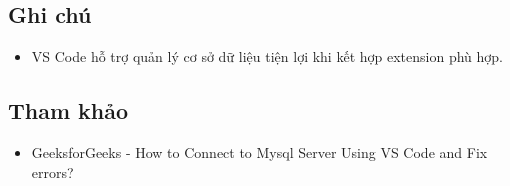 ﻿\documentclass[11pt,a4paper]{article}
\providecommand{\tightlist}{%
    \setlength{\itemsep}{0pt}\setlength{\parskip}{0pt}}
\begin{document}
\subsection{Ghi chú}\label{ghi-chuxfa}

\begin{itemize}
\tightlist
\item
  VS Code hỗ trợ quản lý cơ sở dữ liệu tiện lợi khi kết hợp extension
  phù hợp.
\end{itemize}

\subsection{Tham khảo}\label{tham-khux1ea3o}

\begin{itemize}
\tightlist
\item
  GeeksforGeeks - How to Connect to Mysql Server Using VS Code and Fix
  errors?
\end{itemize}
\end{document}
